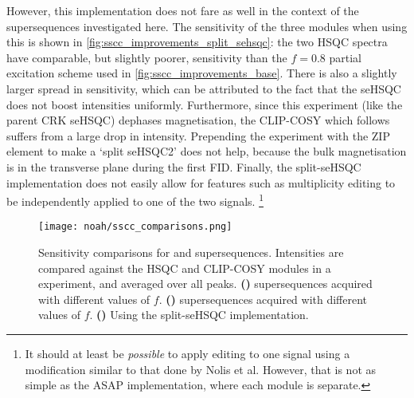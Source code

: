 However, this implementation does not fare as well in the context of the  supersequences investigated here.
The sensitivity of the three modules when using this is shown in \cref{fig:sscc_improvements_split_sehsqc}: the two HSQC spectra have comparable, but slightly poorer, sensitivity than the $f = 0.8$ partial excitation scheme used in \cref{fig:sscc_improvements_base}.
There is also a slightly larger spread in sensitivity, which can be attributed to the fact that the seHSQC does not boost intensities uniformly.
Furthermore, since this experiment (like the parent CRK seHSQC) dephases  magnetisation, the CLIP-COSY which follows suffers from a large drop in intensity.
Prepending the experiment with the ZIP element to make a `split seHSQC2' does not help, because the bulk magnetisation is in the transverse plane during the first FID.
Finally, the split-seHSQC implementation does not easily allow for features such as multiplicity editing to be independently applied to one of the two signals.%
\footnote{It should at least be \textit{possible} to apply editing to one signal using a modification similar to that done by Nolis et al.\autocite{Nolis2019JMR} However, that is not as simple as the ASAP implementation, where each module is separate.}

\begin{figure}[!ht]
    \centering
    \texttt{[image: noah/sscc\_comparisons.png]}%
    {\label{fig:sscc_comparisons_sscc}}%
    {\label{fig:sscc_comparisons_sspcc}}%
    {\label{fig:sscc_comparisons_split_sehsqc}}%
    \caption[Sensitivity comparisons for  and  supersequences]{
        Sensitivity comparisons for  and  supersequences.
        Intensities are compared against the HSQC and CLIP-COSY modules in a  experiment, and averaged over all peaks.
        \textbf{()}  supersequences acquired with different values of $f$.
        \textbf{()}  supersequences acquired with different values of $f$.
        \textbf{()} Using the split-seHSQC implementation.
    }
    \label{fig:sscc_comparisons}
\end{figure}

